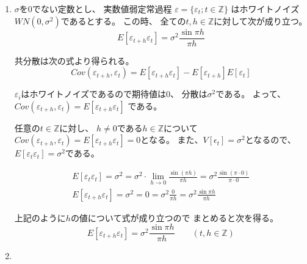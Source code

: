 \documentclass[12pt,b5paper]{ltjsarticle}
\begin{document}
\hrulefill

\begin{enumerate}
 \item
      $\sigma$を$0$でない定数とし、
      実数値弱定常過程
      $\varepsilon = \{ \varepsilon_{t} ; t\in\mathbb{Z}\}$
      はホワイトノイズ$WN(0,\sigma^2)$であるとする。
      この時、
      全ての$t,h \in\mathbb{Z}$に対して次が成り立つ。
      \begin{equation}
       E [ \varepsilon_{t+h}\varepsilon_{t} ]=
        \sigma^2\frac{\sin{\pi h}}{\pi h}
      \end{equation}

      \dotfill

      共分散は次の式より得られる。
      \begin{equation}
       Cov( \varepsilon_{t+h}, \varepsilon_{t} )
        = E[ \varepsilon_{t+h} \varepsilon_{t} ]
        - E[ \varepsilon_{t+h}] E[ \varepsilon_{t} ]
      \end{equation}

      $\varepsilon_{i}$はホワイトノイズであるので期待値は0、
      分散は$\sigma^2$である。
      よって、
      $Cov( \varepsilon_{t+h}, \varepsilon_{t} )
      =E[ \varepsilon_{t+h} \varepsilon_{t} ]$
      である。

      任意の$t\in\mathbb{Z}$に対し、
      $h\ne 0$である$h\in\mathbb{Z}$について
      $Cov( \varepsilon_{t+h}, \varepsilon_{t} ) =E[ \varepsilon_{t+h} \varepsilon_{t} ]=0$となる。
      また、$V[\epsilon_{t}]=\sigma^2$となるので、
      $E[ \varepsilon_{t} \varepsilon_{t} ]=\sigma^2$である。

      \begin{gather}
       E[ \varepsilon_{t} \varepsilon_{t} ]=\sigma^2
        =\sigma^2\cdot \lim_{h\rightarrow 0}\frac{\sin{(\pi h)}}{\pi h}
        =\sigma^2\frac{\sin{(\pi\cdot 0)}}{\pi\cdot 0}\\
       E[ \varepsilon_{t+h} \varepsilon_{t} ]=\sigma^2
        =0
        =\sigma^2\frac{ 0}{\pi h}
        =\sigma^2\frac{ \sin{\pi h}}{\pi h}
      \end{gather}

      上記のように$h$の値について式が成り立つので
      まとめると次を得る。
      \begin{equation}
       E [ \varepsilon_{t+h}\varepsilon_{t} ]=
        \sigma^2\frac{\sin{\pi h}}{\pi h}
        \qquad
        (t,h\in\mathbb{Z})
      \end{equation}


      \hrulefill

 \item
      
\end{enumerate}





\hrulefill
\end{document}
